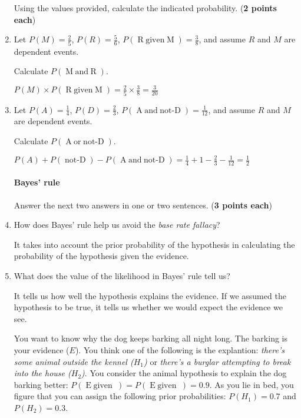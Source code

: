 \documentclass[10pt]{article}
\newcommand\negate[1]{\mathop{\mbox{$not$-$#1$}}}
\newcommand\disjoin[2]{\mathop{\mbox{$#1\; or\; #2$}}}
\newcommand\conjoin[2]{\mathop{\mbox{$#1\; and\; #2$}}}
\newcommand\given[2]{\mathop{\mbox{$#1\; given\; #2$}}}
\begin{document}
\begin{enumerate}
Using the values provided, calculate the indicated probability. (\textbf{2 points each})

\setlength\itemsep{1cm}

\item Let $P(M)=\frac{2}{5}$, $P(R)=\frac{5}{6}$, $P(\given{R}{M})=\frac{3}{8}$, and assume $R$ and $M$ are dependent events. 

Calculate $P(\conjoin{M}{R})$. 

$P(M) \times P(\given{R}{M}) = \frac{2}{5} \times \frac{3}{8} = \frac{3}{20}$

\item Let $P(A)=\frac{1}{4}$, $P(D)=\frac{2}{3}$, $P(\conjoin{A}{\negate{D}})=\frac{1}{12}$, and assume $R$ and $M$ are dependent events. 

Calculate $P(\disjoin{A}{\negate{D}})$. 

$P(A) + P(\negate{D}) - P(\conjoin{A}{\negate{D}}) = \frac{1}{4} + 1 - \frac{2}{3} - \frac{1}{12} = \frac{1}{2}$


\paragraph{Bayes' rule}

Answer the next two answers in one or two sentences. (\textbf{3 points each})

\setlength\itemsep{1cm}

\item How does Bayes' rule help us avoid the \textit{base rate fallacy}?

It takes into account the prior probability of the hypothesis in calculating the probability of the hypothesis given the evidence.

\item What does the value of the likelihood in Bayes' rule tell us?

It tells us how well the hypothesis explains the evidence.  If we assumed the hypothesis to be true, it tells us whether we would expect the evidence we see.


You want to know why the dog keeps barking all night long. The barking is your evidence ($E$). You think one of the following is the explantion: \textit{there's some animal outside the kennel ($H_1$)} or \textit{there's a burglar attempting to break into the house ($H_2$)}.  You consider the animal hypothesis to explain the dog barking better: $P(\given{E}{H_1})= P(\given{E}{H_2})=0.9$. As you lie in bed, you figure that you can assign the following prior probabilities: $P(H_1)=0.7$ and $P(H_2)=0.3$. 


\end{enumerate}
\end{document}

